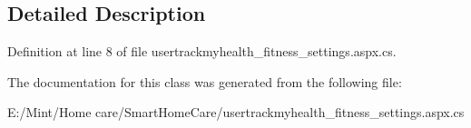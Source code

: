 \subsection{Detailed Description}


Definition at line 8 of file usertrackmyhealth\-\_\-fitness\-\_\-settings.\-aspx.\-cs.



The documentation for this class was generated from the following file\-:\begin{DoxyCompactItemize}
\item 
E\-:/\-Mint/\-Home care/\-Smart\-Home\-Care/usertrackmyhealth\-\_\-fitness\-\_\-settings.\-aspx.\-cs\end{DoxyCompactItemize}

